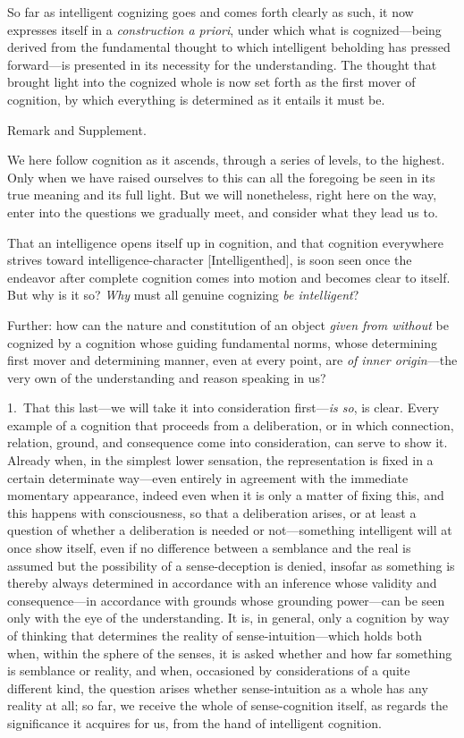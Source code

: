 \documentclass[12pt,a4paper]{book}
\begin{document}
So far as intelligent cognizing goes and comes forth clearly as such, it now
expresses itself in a \emph{construction a priori}, under which what is
cognized---being derived from the fundamental thought to which intelligent
beholding has pressed forward---is presented in its necessity for the
understanding. The thought that brought light into the cognized whole is now set
forth as the first mover of cognition, by which everything is determined as it
entails it must be.

\begin{center}Remark and Supplement.\end{center}
We here follow cognition as it ascends, through a series of levels, to the
highest. Only when we have raised ourselves to this can all the foregoing be seen in
its true meaning and its full light. But we will nonetheless, right here on the
way, enter into the questions we gradually meet, and consider what they lead us
to.

That an intelligence opens itself up in cognition, and that cognition everywhere
strives toward intelligence-character [Intelligenthed], is soon seen once
the endeavor after complete cognition comes into motion and becomes clear to
itself. But why is it so? \emph{Why} must all genuine cognizing \emph{be intelligent}?

Further: how can the nature and constitution of an object \emph{given from
without} be cognized by a cognition whose guiding fundamental norms, whose
determining first mover and determining manner, even at every point, are \emph{of inner
origin}---the very own of the understanding and reason speaking in us?

1.~That this last---we will take it into consideration first---\emph{is so}, is clear.
Every example of a cognition that proceeds from a deliberation, or in which
connection, relation, ground, and consequence come into consideration, can serve
to show it. Already when, in the simplest lower sensation, the representation is
fixed in a certain determinate way---even entirely in agreement with the immediate
momentary appearance, indeed even when it is only a matter of fixing this, and
this happens with consciousness, so that a deliberation arises, or at least a
question of whether a deliberation is needed or not---something intelligent will
at once show itself, even if no difference between a semblance and the real is
assumed but the possibility of a sense-deception is denied, insofar as something
is thereby always determined in accordance with an inference whose validity and
consequence---in accordance with grounds whose grounding power---can be seen only
with the eye of the understanding. It is, in general, only a cognition by way of
thinking that determines the reality of sense-intuition---which holds both when,
within the sphere of the senses, it is asked whether and how far something is
semblance or reality, and when, occasioned by considerations of a quite different
kind, the question arises whether sense-intuition as a whole has any reality at
all; so far, we receive the whole of sense-cognition itself, as regards the
significance it acquires for us, from the hand of intelligent cognition.
\end{document}
